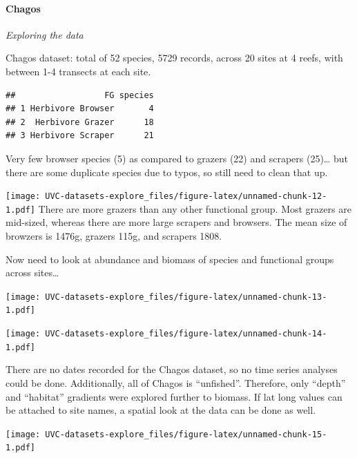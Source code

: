 \documentclass[]{article}
\let\oldparagraph\paragraph
\renewcommand{\paragraph}[1]{\oldparagraph{#1}\mbox{}}
\begin{document}
\paragraph{Chagos}\label{chagos}

\emph{Exploring the data}

Chagos dataset: total of 52 species, 5729 records, across 20 sites at 4
reefs, with between 1-4 transects at each site.

\begin{verbatim}
##                  FG species
## 1 Herbivore Browser       4
## 2  Herbivore Grazer      18
## 3 Herbivore Scraper      21
\end{verbatim}

Very few browser species (5) as compared to grazers (22) and scrapers
(25)\ldots{} but there are some duplicate species due to typos, so still
need to clean that up.

\texttt{[image: UVC-datasets-explore\_files/figure-latex/unnamed-chunk-12-1.pdf]}
There are more grazers than any other functional group. Most grazers are
mid-sized, whereas there are more large scrapers and browsers. The mean
size of browzers is 1476g, grazers 115g, and scrapers 1808.

Now need to look at abundance and biomass of species and functional
groups across sites\ldots{}

\texttt{[image: UVC-datasets-explore\_files/figure-latex/unnamed-chunk-13-1.pdf]}

\texttt{[image: UVC-datasets-explore\_files/figure-latex/unnamed-chunk-14-1.pdf]}

There are no dates recorded for the Chagos dataset, so no time series
analyses could be done. Additionally, all of Chagos is ``unfished''.
Therefore, only ``depth'' and ``habitat'' gradients were explored
further to biomass. If lat long values can be attached to site names, a
spatial look at the data can be done as well.

\texttt{[image: UVC-datasets-explore\_files/figure-latex/unnamed-chunk-15-1.pdf]}
\end{document}
